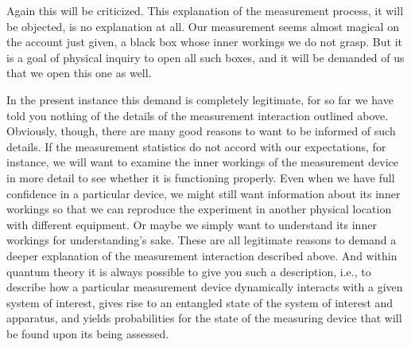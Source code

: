 Again this will be criticized. This explanation of the measurement process, it will be objected, is no explanation at all. Our measurement seems almost magical on the account just given, a black box whose inner workings we do not grasp. But it is a goal of physical inquiry to open all such boxes, and it will be demanded of us that we open this one as well.

In the present instance this demand is completely legitimate, for so far we have told you nothing of the details of the measurement interaction outlined above. Obviously, though, there are many good reasons to want to be informed of such details. If the measurement statistics do not accord with our expectations, for instance, we will want to examine the inner workings of the measurement device in more detail to see whether it is functioning properly. Even when we have full confidence in a particular device, we might still want information about its inner workings so that we can reproduce the experiment in another physical location with different equipment. Or maybe we simply want to understand its inner workings for understanding's sake. These are all legitimate reasons to demand a deeper explanation of the measurement interaction described above. And within quantum theory it is always possible to give you such a description, i.e., to describe how a particular measurement device dynamically interacts with a given system of interest, gives rise to an entangled state of the system of interest and apparatus, and yields probabilities for the state of the measuring device that will be found upon its being assessed.

